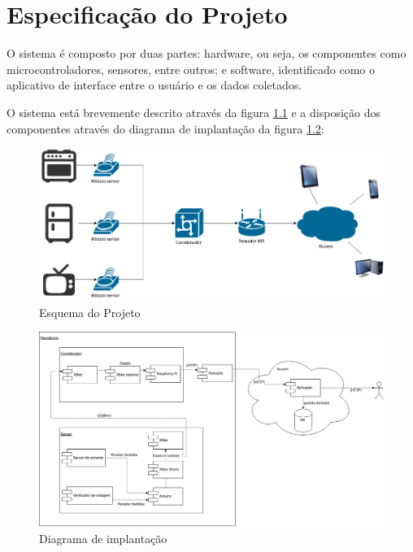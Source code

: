 \chapter{Especificação do Projeto}
\label{Cap:especificacao}

O sistema é composto por duas partes: hardware, ou seja, os componentes como microcontroladores, sensores, entre outros; e software, identificado como o aplicativo de interface entre o usuário e os dados coletados.

O sistema está brevemente descrito através da figura \ref{fig:esqueminha} e a disposição dos componentes através do diagrama de implantação da figura \ref{fig:diagrama_implantacao}:

\begin{figure}
\centering
\includegraphics[width=1\textwidth]{figuras/esqueminha.png}
\caption{\label{fig:esqueminha} Esquema do Projeto}
\end{figure}

\begin{figure}
\centering
\includegraphics[width=1\textwidth]{figuras/diagrama_implantacao.png}
\caption{\label{fig:diagrama_implantacao} Diagrama de implantação}
\end{figure}

